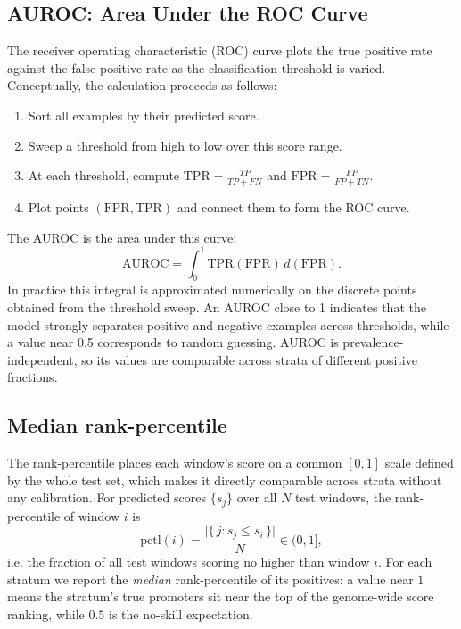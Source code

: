 \documentclass{article}
\begin{document}
\subsection{AUROC: Area Under the ROC Curve}
The receiver operating characteristic (ROC) curve plots the true positive rate against the false positive rate as the classification threshold is varied. Conceptually, the calculation proceeds as follows:
\begin{enumerate}
\item Sort all examples by their predicted score.
\item Sweep a threshold from high to low over this score range.
\item At each threshold, compute $\mathrm{TPR}=\frac{TP}{TP+FN}$ and $\mathrm{FPR}=\frac{FP}{FP+TN}$.
\item Plot points $(\mathrm{FPR},\mathrm{TPR})$ and connect them to form the ROC curve.
\end{enumerate}
The AUROC is the area under this curve:
\begin{equation}
\mathrm{AUROC} = \int_0^1 \mathrm{TPR}(\mathrm{FPR})\, d(\mathrm{FPR}).
\end{equation}
In practice this integral is approximated numerically on the discrete points obtained from the threshold sweep. An AUROC close to 1 indicates that the model strongly separates positive and negative examples across thresholds, while a value near 0.5 corresponds to random guessing. AUROC is prevalence-independent, so its values are comparable across strata of different positive fractions.

\subsection{Median rank-percentile}
The rank-percentile places each window's score on a common $[0,1]$ scale defined by the whole test set, which makes it directly comparable across strata without any calibration. For predicted scores $\{s_j\}$ over all $N$ test windows, the rank-percentile of window $i$ is
\begin{equation}
\mathrm{pctl}(i) = \frac{\big|\{\, j : s_j \le s_i \,\}\big|}{N}\in(0,1],
\end{equation}
i.e. the fraction of all test windows scoring no higher than window $i$. For each stratum we report the \emph{median} rank-percentile of its positives: a value near $1$ means the stratum's true promoters sit near the top of the genome-wide score ranking, while $0.5$ is the no-skill expectation.
\end{document}
